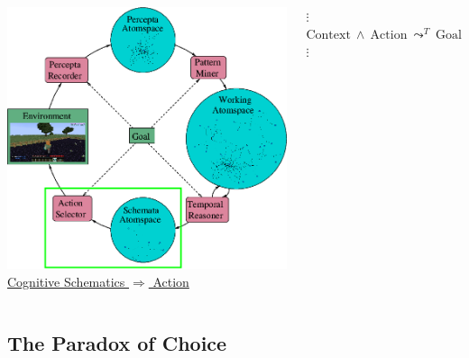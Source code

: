 \documentclass[aspectratio=169]{beamer}
\newcommand{\lpreimp}[1]{\leadsto^{#1}}
\begin{document}
\begin{frame}


  \begin{columns}
    \column{3.2in}
    \includegraphics[scale=0.3]{pictures/rocca-chart-action-highlight-v0.7.png}
    \column{2.5in}
    \underline{Cognitive Schematics $\Rightarrow$ Action}
    \begin{center}
      $\vdots$ \\
      $\text{Context}\ \land\ \text{Action}\ \lpreimp{T}\
      \text{Goal}$ \\
      $\vdots$
    \end{center}
  \end{columns}

\end{frame}

\subsection{The Paradox of Choice}
\end{document}
